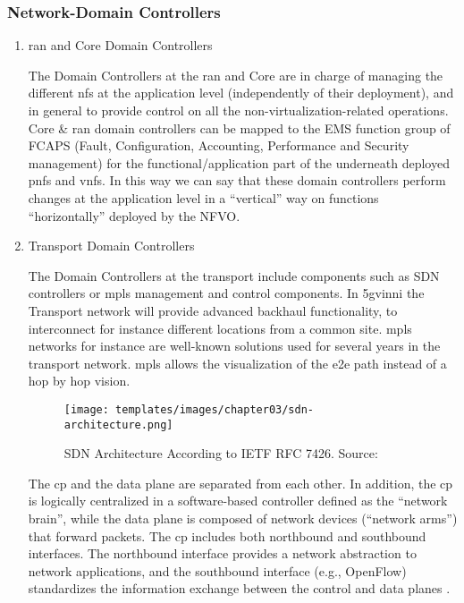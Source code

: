         \subsubsection{Network-Domain Controllers}
        \begin{enumerate}
            \item \acrshort{ran} and Core Domain Controllers
            
            The Domain Controllers at the \acrshort{ran} and Core are in charge of managing the different \acrshort{nf}s at the application level (independently of their deployment), and in general to provide control on all the non-virtualization-related operations. Core \& \acrshort{ran} domain controllers can be mapped to the EMS function group of FCAPS (Fault, Configuration, Accounting, Performance and Security management) for the functional/application part of the underneath deployed \acrshort{pnf}s and \acrshort{vnf}s. In this way we can say that these domain controllers perform changes at the application level in a “vertical” way on functions “horizontally” deployed by the NFVO.
            
            \item Transport Domain Controllers
            
            The Domain Controllers at the transport include components such as SDN controllers or \acrshort{mpls} management and control components. In \acrshort{5gvinni} the Transport network will provide advanced backhaul functionality, to interconnect for instance different locations from a common site.
            \acrshort{mpls} networks for instance are well-known solutions used for several years in the transport network. \acrshort{mpls} allows the visualization of the \acrshort{e2e} path instead of a hop by hop vision.
            
            \begin{figure}[!ht]
                \centering
                \texttt{[image: templates/images/chapter03/sdn-architecture.png]}
                \caption{SDN Architecture According to IETF RFC 7426. Source: \cite{view_5g_architecture}}
                \label{fig:sdn-architecture}
            \end{figure}  
            
            The \acrshort{cp} and the data plane are separated from each other. In addition, the \acrshort{cp} is logically centralized in a software-based controller defined as the “network brain”, while the data plane is composed of network devices (“network arms”) that forward packets. The \acrshort{cp} includes both northbound and southbound interfaces. The northbound interface provides a network abstraction to network applications, and the southbound interface (e.g., OpenFlow) standardizes the information exchange between the control and data planes \cite{rfc7426}.
            
        \end{enumerate}

